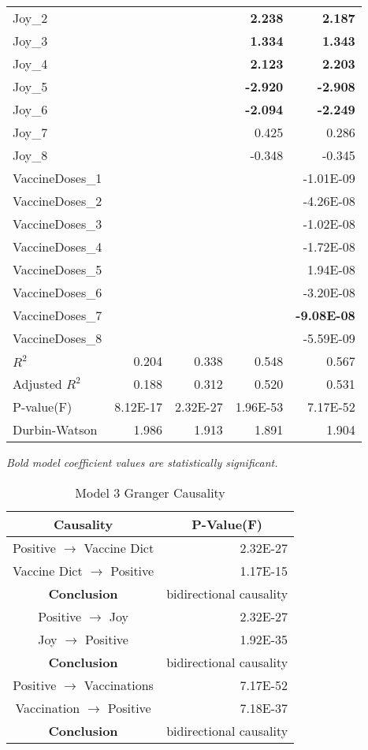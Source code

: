 \begin{longtable}[c]{@{}lrrrr@{}}
Joy\_2 &  &  & \textbf{2.238} & \textbf{2.187} \\
Joy\_3 &  &  & \textbf{1.334} & \textbf{1.343} \\
Joy\_4 &  &  & \textbf{2.123} & \textbf{2.203} \\
Joy\_5 &  &  & \textbf{-2.920} & \textbf{-2.908} \\
Joy\_6 &  &  & \textbf{-2.094} & \textbf{-2.249} \\
Joy\_7 &  &  & 0.425 & 0.286 \\
Joy\_8 &  &  & -0.348 & -0.345 \\
VaccineDoses\_1 &  &  &  & -1.01E-09 \\
VaccineDoses\_2 &  &  &  & -4.26E-08 \\
VaccineDoses\_3 &  &  &  & -1.02E-08 \\
VaccineDoses\_4 &  &  &  & -1.72E-08 \\
VaccineDoses\_5 &  &  &  & 1.94E-08 \\
VaccineDoses\_6 &  &  &  & -3.20E-08 \\
VaccineDoses\_7 &  &  &  & \textbf{-9.08E-08} \\
VaccineDoses\_8 &  &  &  & -5.59E-09 \\
$R^2$ & 0.204 & 0.338 & 0.548 & 0.567 \\
Adjusted $R^2$ & 0.188 & 0.312 & 0.520 & 0.531 \\
P-value(F) & 8.12E-17 & 2.32E-27 & 1.96E-53 & 7.17E-52 \\
Durbin-Watson & 1.986 & 1.913 & 1.891 & 1.904 \\* \bottomrule
\end{longtable}
\emph{Bold model coefficient values are statistically significant.}



\begin{table}[H]
\centering
\begin{tabular}{@{}cr@{}}
\toprule
\textbf{Causality} & \multicolumn{1}{c}{\textbf{P-Value(F)}} \\ \midrule
Positive   $\rightarrow$ Vaccine Dict & 2.32E-27 \\
Vaccine Dict $\rightarrow$  Positive & 1.17E-15 \\
\textbf{Conclusion} & bidirectional causality \\
Positive   $\rightarrow$  Joy & 2.32E-27 \\
Joy $\rightarrow$  Positive & 1.92E-35 \\
\textbf{Conclusion} & bidirectional causality \\
Positive   $\rightarrow$  Vaccinations & 7.17E-52 \\
Vaccination $\rightarrow$  Positive & 7.18E-37 \\
\textbf{Conclusion} & bidirectional causality \\
\bottomrule
\end{tabular}
\caption{Model 3 Granger Causality}
\label{tab:model 3 causality}
\end{table}

